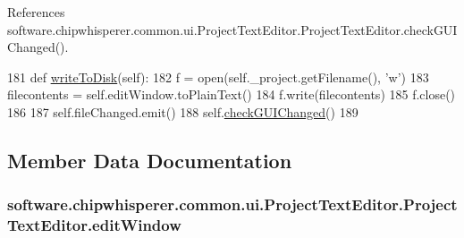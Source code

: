 References software.\+chipwhisperer.\+common.\+ui.\+Project\+Text\+Editor.\+Project\+Text\+Editor.\+check\+G\+U\+I\+Changed().


\begin{DoxyCode}
181     \textcolor{keyword}{def }\hyperlink{classsoftware_1_1chipwhisperer_1_1common_1_1ui_1_1ProjectTextEditor_1_1ProjectTextEditor_a0203095d0e3ac314dca821c9004330a6}{writeToDisk}(self):
182         f = open(self.\_project.getFilename(), \textcolor{stringliteral}{'w'})
183         filecontents = self.editWindow.toPlainText()
184         f.write(filecontents)
185         f.close()
186 
187         self.fileChanged.emit()
188         self.\hyperlink{classsoftware_1_1chipwhisperer_1_1common_1_1ui_1_1ProjectTextEditor_1_1ProjectTextEditor_a805cd3186f39afb718561af096c1e3b1}{checkGUIChanged}()
189 
\end{DoxyCode}


\subsection{Member Data Documentation}
\hypertarget{classsoftware_1_1chipwhisperer_1_1common_1_1ui_1_1ProjectTextEditor_1_1ProjectTextEditor_a7c21e2939513052cef9811cf3155bd7c}{}
\subsubsection[{edit\+Window}]{\setlength{\rightskip}{0pt plus 5cm}software.\+chipwhisperer.\+common.\+ui.\+Project\+Text\+Editor.\+Project\+Text\+Editor.\+edit\+Window}\label{classsoftware_1_1chipwhisperer_1_1common_1_1ui_1_1ProjectTextEditor_1_1ProjectTextEditor_a7c21e2939513052cef9811cf3155bd7c}
\hypertarget{classsoftware_1_1chipwhisperer_1_1common_1_1ui_1_1ProjectTextEditor_1_1ProjectTextEditor_a4360750a0446fb1402db2b357b15a81a}{}

